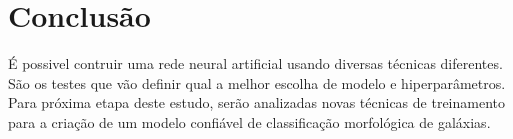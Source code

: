 \section*{Conclusão}

É possivel contruir uma rede neural artificial usando diversas técnicas diferentes. São os testes que vão definir qual a melhor escolha de modelo e hiperparâmetros. Para próxima etapa deste estudo, serão analizadas novas técnicas de treinamento para a criação de um modelo confiável de classificação morfológica de galáxias.